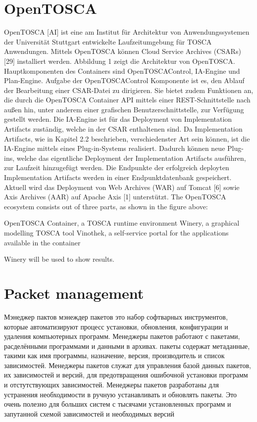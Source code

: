 \section{OpenTOSCA}
OpenTOSCA [AI] ist eine am Institut für Architektur von Anwendungssystemen der Universität
Stuttgart entwickelte Laufzeitumgebung für TOSCA Anwendungen.
Mittels OpenTOSCA können Cloud Service Archives (CSARs) [29] installiert
werden.
Abbildung 1 zeigt die Architektur von OpenTOSCA. Hauptkomponenten des
Containers sind OpenTOSCAControl, IA-Engine und Plan-Engine.
Aufgabe der OpenTOSCAControl Komponente ist es, den Ablauf der Bearbeitung
einer CSAR-Datei zu dirigieren. Sie bietet zudem Funktionen an, die durch
die OpenTOSCA Container API mittels einer REST-Schnittstelle nach außen hin,
unter anderem einer grafischen Benutzerschnittstelle, zur Verfügung gestellt
werden.
Die IA-Engine ist für das Deployment von Implementation Artifacts
zuständig, welche in der CSAR enthaltenen sind. Da Implementation
Artifacts, wie in Kapitel 2.2 beschrieben, verschiedenster Art sein können,
ist die IA-Engine mittels eines Plug-in-Systems realisiert. Dadurch können neue
Plug-ins, welche das eigentliche Deployment der Implementation
Artifacts ausführen, zur Laufzeit hinzugefügt werden. Die Endpunkte der
erfolgreich deployten Implementation Artifacts werden in einer Endpunktdatenbank
gespeichert. Aktuell wird das Deployment von Web Archives
(WAR) auf Tomcat [6] sowie Axis Archives (AAR) auf Apache Axis [1] unterstützt.
The OpenTOSCA ecosystem consists out of three parts, as shown in the figure above:

OpenTOSCA Container, a TOSCA runtime environment
Winery, a graphical modelling TOSCA tool
Vinothek, a self-service portal for the applications available in the container

Winery will be used to show results.
\section{Packet management}

Мэнеджер пактов
мэнеждер пакетов это набор софтварных инструментов, которые автоматизируют процесс установки, обновления, конфигурации и удаления компьютерных программ. 
Менеджеры пакетов работают с пакетами, расделёнными программами и данными в архивах. пакеты содержат метаданные, такими как имя программы, назначение, версия, производитель и список зависимостей. 
Менеджеры пакетов служат для управления базой данных пакетов, их зависимостей и версий, для предотвращения ошибочной установки программ и отстутствующих зависимостей. 
Менеджеры пакетов разработаны для устранения необходимости в ручную устанавливать и обновлять пакеты. Это очень полезно для больших систем с тысячами установленных программ и запутанной схемой зависимостей и необходимых версий

